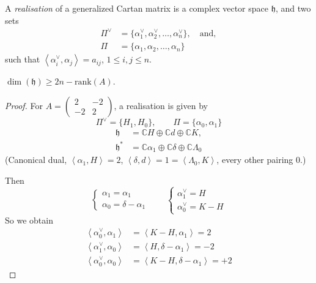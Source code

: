 \begin{definition}
\label{definition-realisation}
A {\it realisation} of a generalized Cartan
matrix is a complex vector space
 $\mathfrak{h}$, and two sets
$$
\begin{aligned}
\Pi^\vee&=\{\alpha_1^\vee,
\alpha_2^\vee,\ldots,\alpha_n^\vee\},\quad
\text{and},\\
\Pi&=\{\alpha_1,\alpha_2,\ldots,\alpha_n\}
\end{aligned}
$$
such that
$\left\langle{}\alpha_i^\vee,\alpha_j\right\rangle{}=a_{ij}$,
$1\leq i,j\leq n$.
\end{definition}

\begin{exercise}
\label{exercise-realisation}
$\dim(\mathfrak{h})\geq 2n-\text{rank}(A)$.
\end{exercise}

\begin{proof}
For $A=\begin{pmatrix}
2&-2\\
-2&2
\end{pmatrix}$, a realisation is given by
$$
\Pi^\vee=\{H_1,H_0\},\qquad
\Pi=\{\alpha_0,\alpha_1\}
$$
$$
\begin{aligned}
\mathfrak{h}&=\mathbb{C}H\oplus\mathbb{C}
d\oplus\mathbb{C}K,\\
\mathfrak{h}^*&=\mathbb{C}
\alpha_1\oplus\mathbb{C}\delta
\oplus\mathbb{C}\Lambda_0
\end{aligned}
$$
(Canonical dual, $\left\langle{}\alpha_1,H\right\rangle{}=2$,
$\left\langle{}\delta,d\right\rangle{}=1=\left\langle{}\Lambda_0,
K\right\rangle{}$,
every other pairing $0$.)

Then
$$
\begin{cases}
\alpha_1=\alpha_1\\
\alpha_0=\delta-\alpha_1
\end{cases}\qquad
\begin{cases}
\alpha_1^\vee=H \\
\alpha_0^\vee = K-H
\end{cases}
$$
So we obtain
$$
\begin{aligned}
\left\langle{}\alpha_0^\vee,\alpha_1\right\rangle{}&=\left\langle{}K-
H,\alpha_1\right\rangle{}=2\\
\left\langle{}\alpha_1^\vee,\alpha_0\right\rangle{}&=\left\langle{}H,
\delta-\alpha_1\right\rangle{}=-2\\
\left\langle{}\alpha_0^\vee,\alpha_0\right\rangle{}&=\left\langle{}K-
H,\delta-\alpha_1\right\rangle{}=+2
\end{aligned}
$$

\end{proof}

